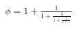 \documentclass[preview]{standalone}
\begin{document}
\begin{align*}
\phi = 1 + \frac{1}{1 + \frac{1}{1 + \frac{1}{1 + ...}}}
\end{align*}
\end{document}
